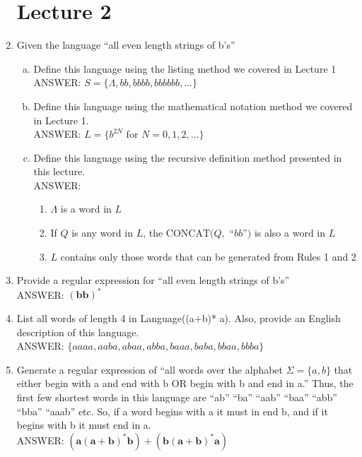 \documentclass{article}
\begin{document}
\begin{enumerate}[1.]
        \section{Lecture 2}
    \item Given the language ``all even length strings of b’s''
        \begin{enumerate}[a)]
            \item Define this language using the listing method we covered in
                Lecture 1 \\
                ANSWER: $S = \{\Lambda, bb, bbbb, bbbbbb, \dots\}$
            \item Define this language using the mathematical notation method we
                covered in Lecture 1. \\
                ANSWER: $L = \{b^{2N} \text{ for } N = 0, 1, 2, \dots\}$
            \item Define this language using the recursive definition method
                presented in this lecture. \\
                ANSWER:
                \begin{enumerate}[1)]
                    \item $\Lambda$ is a word in $L$
                    \item If $Q$ is any word in $L$, the $\text{CONCAT}(Q,$
                        ``$bb$''$)$ is also a word in $L$
                    \item $L$ contains only those words that can be generated from
                        Rules 1 and 2
                \end{enumerate}
        \end{enumerate}
    \item Provide a regular expression for ``all even length strings of b's'' \\
        ANSWER: $\bm{(bb)^*}$
    \item List all words of length 4 in Language((a+b)* a). Also, provide an
        English description of this language. \\
        ANSWER: $\{aaaa, aaba, abaa, abba, baaa, baba, bbaa, bbba\}$
    \item Generate a regular expression of ``all words over the alphabet $\Sigma
        = \{a, b\}$ that either begin with a and end with b OR begin with b and
        end in a.'' Thus, the first few shortest words in this language are
        ``ab'' ``ba'' ``aab'' ``baa'' ``abb'' ``bba'' ``aaab'' etc. So, if a
        word begins with a it must in end b, and if it begins with b it must end
        in a. \\
        ANSWER: $\bm{(a(a+b)^*b)+(b(a+b)^*a)}$


\end{enumerate}
\end{document}

